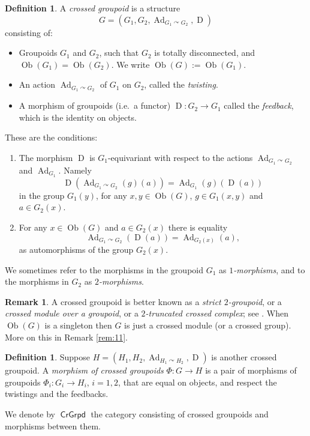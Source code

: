 \documentclass[a4paper,10pt]{amsart}
\theoremstyle{definition}
\newtheorem{dfn}[equation]{Definition}
\newtheorem{rem}[equation]{Remark}
\numberwithin{equation}{section}
\newcommand{\opn}{\operatorname}
\newcommand{\cat}[1]{\operatorname{\mathsf{#1}}}
\newcommand{\rmitem}[1]{\item[\text{\textup{(#1)}}]}
\newcommand{\crvar}{\curvearrowright}
\begin{document}
\begin{dfn} \label{dfn:cosim.101}
A {\em crossed groupoid} is a structure 
\[ G = 
( G_1, G_2, 
\opn{Ad}_{G_1 \crvar G_{2}}, \opn{D} ) \]
consisting of:
\begin{itemize}
\item Groupoids $G_1$ and $G_2$, such that 
$G_2$ is totally disconnected, and 
$\opn{Ob}(G_1) = \opn{Ob}(G_2)$. 
We write $\opn{Ob}(G) := \opn{Ob}(G_1)$. 

\item An action $\opn{Ad}_{G_1 \crvar G_{2}}$ of 
$G_1$ on $G_2$, called the {\em twisting}. 

\item A morphism of groupoids (i.e.\ a functor) 
$\opn{D} : G_2 \to G_1$
called the {\em feedback}, which is the identity on objects.
\end{itemize}

These are the conditions:
\begin{enumerate}
\rmitem{i} The morphism $\opn{D}$ is $G_1$-equivariant with respect to
the actions $\opn{Ad}_{G_1 \crvar G_{2}}$ and
$\opn{Ad}_{G_1}$. Namely 
\[ \opn{D}(\opn{Ad}_{G_1 \crvar G_{2}}(g)(a)) =
\opn{Ad}_{G_1}(g)(\opn{D}(a)) \]
in the group $G_1(y)$, for any $x, y \in \opn{Ob}(G)$, 
$g \in G_1(x, y)$ and $a \in G_2(x)$.

\rmitem{ii} For any $x \in \opn{Ob}(G)$ and 
$a \in G_2(x)$ there is equality
\[ \opn{Ad}_{G_1 \crvar G_{2}}(\opn{D}(a)) =
\opn{Ad}_{G_2(x)}(a) , \]
as automorphisms of the group $G_2(x)$.
\end{enumerate}
\end{dfn}

We sometimes refer to the morphisms in the groupoid $G_1$ as {\em
$1$-morphisms}, and to the morphisms in $G_2$ as {\em $2$-morphisms}. 

\begin{rem} \label{rem:cosim.101}
A crossed groupoid is better known as a {\em strict $2$-groupoid}, or a
{\em crossed module over a groupoid}, or a {\em $2$-truncated crossed
complex}; see \cite{Bw}. When
$\opn{Ob}(G)$ is a singleton then $G$ is just a crossed
module (or a crossed group). More on this in Remark \ref{rem:11}.
\end{rem}

\begin{dfn}
Suppose 
$H = ( H_1, H_2, \opn{Ad}_{H_1 \crvar H_{2}}, \opn{D} )$ 
is another crossed groupoid. A {\em morphism of crossed groupoids}
$\Phi : G \to H$
is a pair of morphisms of groupoids 
$\Phi_i : G_i \to H_i$, $i = 1, 2$, that are equal on objects, and
respect the twistings and the feedbacks. 

We denote by
$\cat{CrGrpd}$ the category consisting of crossed groupoids and morphisms
between them.
\end{dfn}
\end{document}
